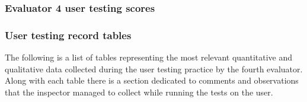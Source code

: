 
\subsubsection{Evaluator 4 user testing scores}

\subsubsection*{User testing record tables}
The following is a list of tables representing the most relevant quantitative and qualitative data collected during the user testing practice by the fourth evaluator.
Along with each table there is a section dedicated to comments and observations that the inspector managed to collect while running the tests on the user.

\vspace{0.8cm}

